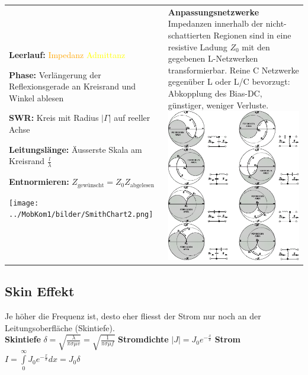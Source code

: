 \begin{tabular}{ll}
{\begin{liste}
      \item \textbf{Leerlauf:}      \textcolor{orange}{Impedanz} \textcolor{yellow}{Admittanz}
      \item \textbf{Phase:} Verlängerung der Reflexionsgerade an Kreisrand und Winkel ablesen
      \item \textbf{SWR:} Kreis mit Radius $|\Gamma|$ auf reeller Achse
      \item \textbf{Leitungslänge:} Äusserste Skala am Kreisrand  $\frac{l}{\lambda}$
      \item \textbf{Entnormieren:} $Z_{\text{gewünscht}} = Z_0
      Z_{\text{abgelesen}}$
    \end{liste}
    \texttt{[image: ../MobKom1/bilder/SmithChart2.png]}
    }
& \parbox{9cm}{
    \textbf{Anpassungsnetzwerke} \\
    \small{Impedanzen innerhalb der nicht-schattierten Regionen sind in eine
    resistive Ladung $Z_0$ mit den gegebenen L-Netzwerken transformierbar}.
    Reine C Netzwerke gegenüber L oder L/C bevorzugt: Abkopplung des
    Bias-DC, günstiger, weniger Verluste. \\
    \includegraphics[width=8.5cm]{./bilder/rfdesign_smithchart_matching_Ltypes.png}
    }
\end{tabular}

\subsection{Skin Effekt }
Je höher die Frequenz ist, desto eher fliesst der Strom nur noch an der
Leitungsoberfläche (Skintiefe). \\
\textbf{Skintiefe} $\delta = \sqrt{\frac{\lambda}{\pi\sigma\mu v}}
         = \sqrt{\frac{1}{\pi\sigma\mu f}}$ \qquad
\textbf{Stromdichte} $|J|=J_0 e^{-\frac x{\delta}}$ \qquad 
\textbf{Strom} $I = \int\limits_{0}^{\infty} J_0 e^{-\frac{x}{\delta}} dx = J_0
\delta$\\

